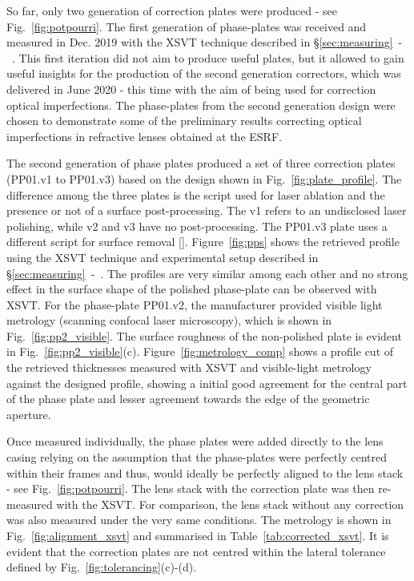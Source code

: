 \begin{refsection}
So far, only two generation of correction plates were produced - see Fig.~\ref{fig:potpourri}. The first generation of phase-plates was received and measured in Dec. 2019 with the XSVT technique described in \S\ref{sec:measuring}~-~\textit{}. This first iteration did not aim to produce useful plates, but it allowed to gain useful insights for the production of the second generation correctors, which was delivered in June 2020 - this time with the aim of being used for correction optical imperfections. The phase-plates from the second generation design were chosen to demonstrate some of the preliminary results correcting optical imperfections in refractive lenses obtained at the ESRF.

The second generation of phase plates produced a set of three correction plates (PP01.v1 to PP01.v3) based on the design shown in Fig.~\ref{fig:plate_profile}. The difference among the three plates is the script used for laser ablation and the presence or not of a surface post-processing. The v1 refers to an undisclosed laser polishing, while v2 and v3 have no post-processing. The PP01.v3 plate uses a different script for surface removal [\cite{Antipov2020}]. Figure~\ref{fig:pps} shows the retrieved profile using the XSVT technique and experimental setup described in \S\ref{sec:measuring}~-~\textit{}. The profiles are very similar among each other and no strong effect in the surface shape of the polished phase-plate can be observed with XSVT. For the phase-plate PP01.v2, the manufacturer provided visible light metrology (scanning confocal laser microscopy), which is shown in Fig.~\ref{fig:pp2_visible}. The surface roughness of the non-polished plate is evident in Fig.~\ref{fig:pp2_visible}(c). Figure~\ref{fig:metrology_comp} shows a profile cut of the retrieved thicknesses measured with XSVT and visible-light metrology against the designed profile, showing a initial good agreement for the central part of the phase plate and lesser agreement towards the edge of the geometric aperture.  

Once measured individually, the phase plates were added directly to the lens casing relying on the assumption that the phase-plates were perfectly centred within their frames and thus, would ideally be perfectly aligned to the lens stack - see Fig.~\ref{fig:potpourri}. The lens stack with the correction plate was then re-measured with the XSVT. For comparison, the lens stack without any correction was also measured under the very same conditions. The metrology is shown in Fig.~\ref{fig:alignment_xsvt} and summarised in Table~\ref{tab:corrected_xsvt}. It is evident that the correction plates are not centred within the lateral tolerance defined by Fig.~\ref{fig:tolerancing}(c)-(d).


\end{refsection}
